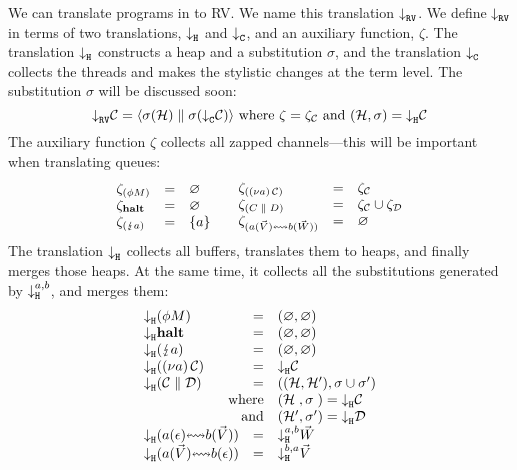 \documentclass[sigplan,screen,review]{acmart}
\begin{document}
We can translate programs in \affineAGV to RV. We name this translation $\mtr{}$. We define $\mtr{}$ in terms of two translations, $\mtrh{}$ and $\mtrc{}$, and an auxiliary function, $\zeta$. The translation $\mtrh{}$ constructs a heap and a substitution $\sigma$, and the translation $\mtrc{}$ collects the threads and makes the stylistic changes at the term level. The substitution $\sigma$ will be discussed soon:
\[
  \mtr{\gvConf{C}} = \rvRedTup[\sigma(\mtrc{\gvConf{C}})]{\sigma(\rvHeap{H})}{}
  \text{ where }\zeta=\zeta_{\gvConf{C}}\text{ and }(\rvHeap{H},\sigma)=\mtrh{\gvConf{C}}
\]
The auxiliary function $\zeta$ collects all zapped channels---this will be important when translating queues:
\[
  \begin{array}{lcl}
    \zeta_{\parens{\gvThread{\phi}{M}}}
    & = & \varnothing
    \\
    \zeta_{\gvHalt}
    & = & \varnothing
    \\
    \zeta_{\parens{\gvZap{a}}}
    & = & \{a\}
  \end{array}
  \quad
  \begin{array}{lcl}
    \zeta_{\parens{\gvRes{a}{\gvConf{C}}}}
    & = & \zeta_{\gvConf{C}}
    \\
    \zeta_{\parens{\gvPar{C}{D}}}
    & = & \zeta_{\gvConf{C}} \cup \zeta_{\gvConf{D}}
    \\
    \zeta_{\parens{\gvBuf{a}{\gvVec{V}}{b}{\gvVec{W}}}}
    & = & \varnothing
  \end{array}
\]
The translation $\mtrh{}$ collects all buffers, translates them to heaps, and finally merges those heaps. At the same time, it collects all the substitutions generated by $\mtrh[a,b]{}$, and merges them:
\[
  \begin{array}{c}
    \begin{array}{lcl}
      \mtrh{\parens{\gvThread{\phi}{M}}}
      & = & (\varnothing, \varnothing) 
      \\
      \mtrh{\gvHalt}
      & = & (\varnothing, \varnothing)
      \\
      \mtrh{\parens{\gvZap{a}}}
      & = & (\varnothing, \varnothing)
      \\
      \mtrh{\parens{\gvRes{a}{\gvConf{C}}}}
      & = & \mtrh{\gvConf{C}}
      \\
      \mtrh{\parens{\gvPar{\gvConf{C}}{\gvConf{D}}}}
      & = & ((\rvHeap{H}\st{,}\,\rvHeap{H'}), \sigma \cup \sigma')
      \\
      \multicolumn{2}{r}{\text{where}}
      & (\rvHeap{H}\hphantom{'}, \sigma\hphantom{'}) = \mtrh{\gvConf{C}}
      \\
      \multicolumn{2}{r}{\text{and}}
      & (\rvHeap{H}', \sigma') = \mtrh{\gvConf{D}}
      \\
      \mtrh{\parens{\gvBuf{a}{\gvVecEmp}{b}{\gvVec{V}}}}
      & = & \mtrh[a,b]{\gvVec{W}}
      \\
      \mtrh{\parens{\gvBuf{a}{\gvVec{V}}{b}{\gvVecEmp}}}
      & = & \mtrh[b,a]{\gvVec{V}}
    \end{array}
  \end{array}
\]
\end{document}
